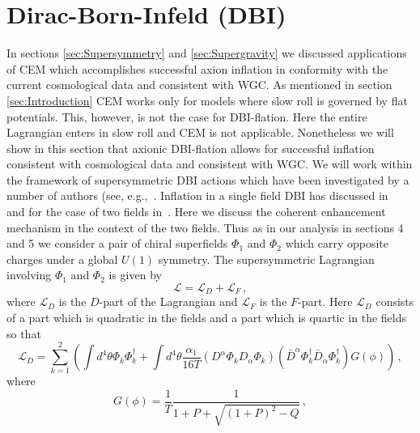 \documentclass[12pt]{article}
\begin{document}
\section{Dirac-Born-Infeld (DBI) \label{sec:DBI}}
In sections \ref{sec:Supersymmetry} and \ref{sec:Supergravity} we discussed applications of CEM which accomplishes successful axion inflation in conformity with the current cosmological data and consistent with WGC.
As mentioned in section \ref{sec:Introduction} CEM works only for models where slow roll is governed by flat potentials.
This, however, is not the case for DBI-flation.
Here the entire Lagrangian enters in slow roll and CEM is not applicable.
Nonetheless we will show in this section that axionic DBI-flation allows for successful inflation consistent with cosmological data and consistent with WGC.
We will work within the framework of supersymmetric DBI actions which have been investigated by a number of authors (see, e.g.,~\cite{Nath:2018xxe, Khoury:2010gb, Khoury:2011da, Baumann:2011nk, Baumann:2011nm, Rocek:1997hi, Tseytlin:1999dj, Ito:2007hy, Billo:2008sp, Sasaki:2012ka, Aoki:2016tod}.
Inflation in a single field DBI has discussed in~\cite{Sasaki:2012ka} and for the case of two fields in~\cite{Nath:2018xxe}.
Here we discuss the coherent enhancement mechanism in the context of the two fields.
Thus as in our analysis in sections 4 and 5 we consider a pair of chiral superfields $\Phi_1$ and $\Phi_2$ which carry opposite charges under a global $U\left(1\right)$ symmetry.
The supersymmetric Lagrangian involving $\Phi_1$ and $\Phi_2$ is given by
\begin{equation} \label{eq:DBI:lagrangianTerms}
  \mathcal{L} = \mathcal{L}_D + \mathcal{L}_F\,,
\end{equation}
where $\mathcal{L}_D$ is the $D$-part of the Lagrangian and $\mathcal{L}_F$ is the $F$-part.
Here $\mathcal{L}_D$ consists of a part which is quadratic in the fields and a part which is quartic in the fields so that
\begin{equation} \label{eq:DBI:lagrangianD}
  \mathcal{L}_D = \sum_{k = 1}^2 \left(\int d^4 \theta \Phi_k \Phi_k^\dagger
    + \int d^4 \theta \frac{\alpha_1}{16 T}
      \left(D^\alpha \Phi_k D_\alpha \Phi_k\right)
      \left({\bar D}^{\dot\alpha} \Phi_k^\dagger {\bar D}_{\dot\alpha} \Phi_k^\dagger\right)
      G\left(\phi\right)\right)\,,
\end{equation}
where
\begin{equation}
  G\left(\phi\right) = \frac{1}{T} \frac{1}{1 + P + \sqrt{\left(1 + P\right)^2 - Q}}\,,
\end{equation}
\end{document}
